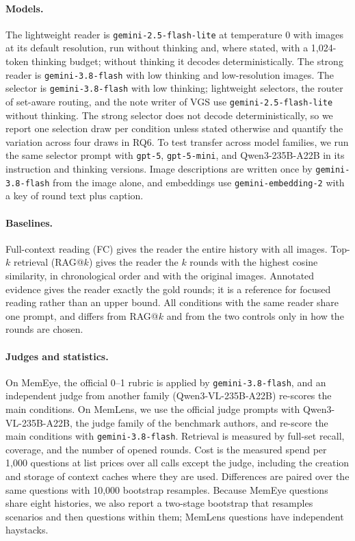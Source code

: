 \paragraph{Models.} The lightweight reader is \texttt{gemini-2.5-flash-lite} at temperature 0 with images at its default resolution, run without thinking and, where stated, with a 1,024-token thinking budget; without thinking it decodes deterministically. The strong reader is \texttt{gemini-3.8-flash} with low thinking and low-resolution images. The \qss{} selector is \texttt{gemini-3.8-flash} with low thinking; lightweight selectors, the router of set-aware routing, and the note writer of VGS use \texttt{gemini-2.5-flash-lite} without thinking. The strong selector does not decode deterministically, so we report one selection draw per condition unless stated otherwise and quantify the variation across four draws in RQ6. To test transfer across model families, we run the same selector prompt with \texttt{gpt-5}, \texttt{gpt-5-mini}, and Qwen3-235B-A22B in its instruction and thinking versions. Image descriptions are written once by \texttt{gemini-3.8-flash} from the image alone, and embeddings use \texttt{gemini-embedding-2} with a key of round text plus caption.

\paragraph{Baselines.} Full-context reading (FC) gives the reader the entire history with all images. Top-$k$ retrieval (RAG@$k$) gives the reader the $k$ rounds with the highest cosine similarity, in chronological order and with the original images. Annotated evidence gives the reader exactly the gold rounds; it is a reference for focused reading rather than an upper bound. All conditions with the same reader share one prompt, and \qss{} differs from RAG@$k$ and from the two controls only in how the rounds are chosen.

\paragraph{Judges and statistics.} On MemEye, the official 0--1 rubric is applied by \texttt{gemini-3.8-flash}, and an independent judge from another family (Qwen3-VL-235B-A22B) re-scores the main conditions. On MemLens, we use the official judge prompts with Qwen3-VL-235B-A22B, the judge family of the benchmark authors, and re-score the main conditions with \texttt{gemini-3.8-flash}. Retrieval is measured by full-set recall, coverage, and the number of opened rounds. Cost is the measured spend per 1,000 questions at list prices over all calls except the judge, including the creation and storage of context caches where they are used. Differences are paired over the same questions with 10,000 bootstrap resamples. Because MemEye questions share eight histories, we also report a two-stage bootstrap that resamples scenarios and then questions within them; MemLens questions have independent haystacks.
